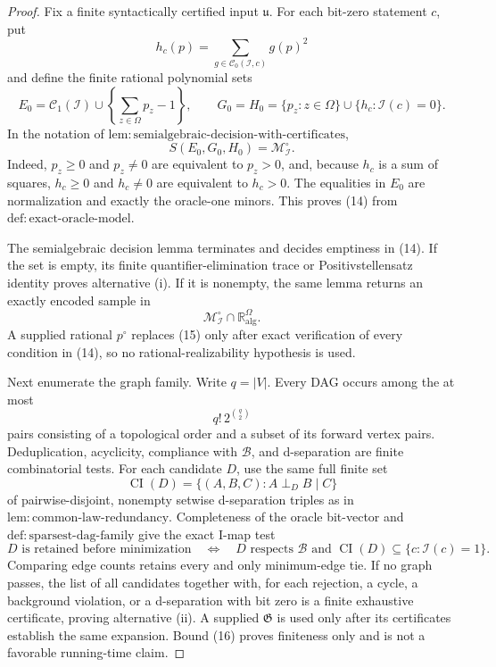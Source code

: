 \documentclass{article}
\begin{document}
\begin{proof}
Fix a finite syntactically certified input \(\mathfrak u\).  For each bit-zero statement \(c\), put
\[
 h_c(p)=\sum_{g\in\mathcal C_0(\mathcal I,c)}g(p)^2
\]
and define the finite rational polynomial sets
\[
 E_0=\mathcal C_1(\mathcal I)\cup
 \left\{\sum_{z\in\Omega}p_z-1\right\},
 \qquad
 G_0=H_0=\{p_z:z\in\Omega\}
 \cup\{h_c:\mathcal I(c)=0\}. \tag{13}
\]
In the notation of \(\mathrm{lem{:}semialgebraic\text{-}decision\text{-}with\text{-}certificates}\),
\[
 S(E_0,G_0,H_0)=\mathcal M_{\mathcal I}^{\circ}. \tag{14}
\]
Indeed, \(p_z\geq0\) and \(p_z\neq0\) are equivalent to \(p_z>0\), and, because \(h_c\) is a sum of squares, \(h_c\geq0\) and \(h_c\neq0\) are equivalent to \(h_c>0\).  The equalities in \(E_0\) are normalization and exactly the oracle-one minors.  This proves (14) from \(\mathrm{def{:}exact\text{-}oracle\text{-}model}\).

The semialgebraic decision lemma terminates and decides emptiness in (14).  If the set is empty, its finite quantifier-elimination trace or Positivstellensatz identity proves alternative (i).  If it is nonempty, the same lemma returns an exactly encoded sample in
\[
 \mathcal M_{\mathcal I}^{\circ}\cap\mathbb R_{\mathrm{alg}}^\Omega. \tag{15}
\]
A supplied rational \(p^{\circ}\) replaces (15) only after exact verification of every condition in (14), so no rational-realizability hypothesis is used.

Next enumerate the graph family.  Write \(q=|V|\).  Every DAG occurs among the at most
\[
 q!\,2^{\binom q2} \tag{16}
\]
pairs consisting of a topological order and a subset of its forward vertex pairs.  Deduplication, acyclicity, compliance with \(\mathcal B\), and d-separation are finite combinatorial tests.  For each candidate \(D\), use the same full finite set
\[
 \operatorname{CI}(D)=\{(A,B,C):A\perp_D B\mid C\}
\]
of pairwise-disjoint, nonempty setwise d-separation triples as in \(\mathrm{lem{:}common\text{-}law\text{-}redundancy}\).  Completeness of the oracle bit-vector and \(\mathrm{def{:}sparsest\text{-}dag\text{-}family}\) give the exact I-map test
\[
 D\text{ is retained before minimization}
 \quad\Longleftrightarrow\quad
 D\text{ respects }\mathcal B
 \text{ and }\operatorname{CI}(D)\subseteq\{c:\mathcal I(c)=1\}. \tag{17}
\]
Comparing edge counts retains every and only minimum-edge tie.  If no graph passes, the list of all candidates together with, for each rejection, a cycle, a background violation, or a d-separation with bit zero is a finite exhaustive certificate, proving alternative (ii).  A supplied \(\mathfrak G\) is used only after its certificates establish the same expansion.  Bound (16) proves finiteness only and is not a favorable running-time claim.


\end{proof}
\end{document}
